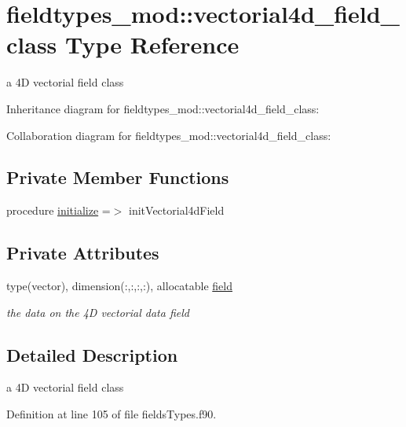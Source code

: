 \hypertarget{structfieldtypes__mod_1_1vectorial4d__field__class}{}\section{fieldtypes\+\_\+mod\+:\+:vectorial4d\+\_\+field\+\_\+class Type Reference}
\label{structfieldtypes__mod_1_1vectorial4d__field__class}


a 4D vectorial field class  




Inheritance diagram for fieldtypes\+\_\+mod\+:\+:vectorial4d\+\_\+field\+\_\+class\+:


Collaboration diagram for fieldtypes\+\_\+mod\+:\+:vectorial4d\+\_\+field\+\_\+class\+:
\subsection*{Private Member Functions}
\begin{DoxyCompactItemize}
\item 
procedure \mbox{\hyperlink{structfieldtypes__mod_1_1vectorial4d__field__class_a4c87f50257a0c76534894e2ac4f1088e}{initialize}} =$>$ init\+Vectorial4d\+Field
\end{DoxyCompactItemize}
\subsection*{Private Attributes}
\begin{DoxyCompactItemize}
\item 
type(vector), dimension(\+:,\+:,\+:,\+:), allocatable \mbox{\hyperlink{structfieldtypes__mod_1_1vectorial4d__field__class_a85ba919e29b243522393615f90cb6abe}{field}}
\begin{DoxyCompactList}\small\item\em the data on the 4D vectorial data field \end{DoxyCompactList}\end{DoxyCompactItemize}


\subsection{Detailed Description}
a 4D vectorial field class 

Definition at line 105 of file fields\+Types.\+f90.



